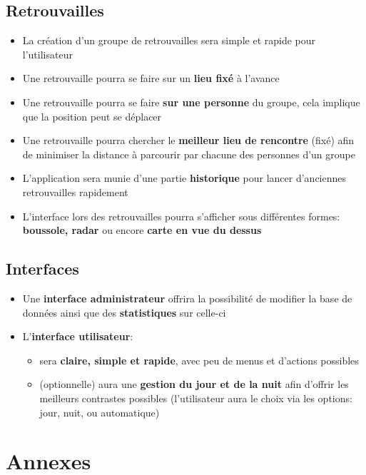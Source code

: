 \documentclass[french]{article}
\begin{document}
		\subsection{Retrouvailles}
			\begin{itemize}
				\item La création d'un groupe de retrouvailles sera simple et rapide pour l'utilisateur
				\item Une retrouvaille pourra se faire sur un \textbf{lieu fixé} à l'avance 
				\item Une retrouvaille pourra se faire \textbf{sur une personne} du groupe, cela implique que la position peut se déplacer
				\item Une retrouvaille pourra chercher le \textbf{meilleur lieu de rencontre} (fixé) afin de minimiser la distance à parcourir par chacune des personnes d'un groupe
				\item L'application sera munie d'une partie \textbf{historique} pour lancer d'anciennes retrouvailles rapidement 
				\item L'interface lors des retrouvailles pourra s'afficher sous différentes formes: \textbf{boussole, radar} ou encore \textbf{carte en vue du dessus}
			\end{itemize}
			
		\subsection{Interfaces}
			\begin{itemize}
				\item Une \textbf{interface administrateur} offrira la possibilité de modifier la base de données ainsi que des \textbf{statistiques} sur celle-ci
				\item L'\textbf{interface utilisateur}:
				\begin{itemize}
					\item sera \textbf{claire, simple et rapide}, avec peu de menus et d'actions possibles
					\item (optionnelle) aura une \textbf{gestion du jour et de la nuit} afin d'offrir les meilleurs contrastes possibles (l'utilisateur aura le choix via les options: jour, nuit, ou automatique)
				\end{itemize}
			\end{itemize}
		
	\section{Annexes}
\end{document}

